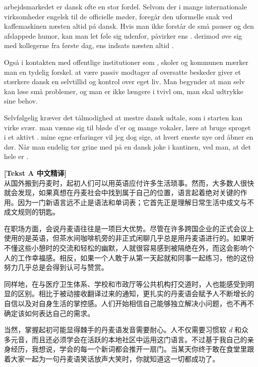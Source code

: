  arbejdsmarkedet er dansk ofte en stor fordel. Selvom der i mange internationale virksomheder  engelsk til de officielle møder, foregår den uformelle snak ved kaffemaskinen næsten altid på dansk. Hvis man ikke forstår de små pauser og den afslappede humor, kan man let føle sig udenfor,  påvirker ens .  derimod øve sig med kollegerne fra første dag,  ens indsats næsten altid .

Også i kontakten med offentlige institutioner som , skoler og kommunen mærker man en tydelig forskel.  at være passiv modtager af oversatte beskeder giver et stærkere dansk en  selvtillid og kontrol over eget liv. Man begynder at  man selv kan løse små problemer, og man er ikke længere i tvivl om,  man skal udtrykke sine behov.

Selvfølgelig kræver det tålmodighed at mestre dansk udtale, som i starten kan virke svær.  man vænne sig til bløde d'er og mange vokaler,  lære at bruge sproget i et aktivt .  mine egne erfaringer vil jeg dog sige, at hvert eneste nye ord åbner en dør. Når man endelig tør grine med på en dansk joke i kantinen, ved man, at det hele er .

\begin{transbox}
\small
\textbf{\color{NCDTeal}[Tekst A 中文精译]}\\
从国外搬到丹麦时，起初人们可以用英语应付许多生活琐事。然而，大多数人很快就会发现，如果真想在丹麦社会中找到属于自己的位置，语言起着绝对关键的作用。因为一门新语言远不止是语法和单词表；它首先正是理解日常生活中成文与不成文规则的钥匙。

在职场方面，会说丹麦语往往是一项巨大优势。尽管在许多跨国企业的正式会议上使用的是英语，但茶水间咖啡机旁的非正式闲聊几乎总是用丹麦语进行的。如果听不懂这些小憩时的交流和轻松的幽默，人就很容易感到被隔绝在外，而这会影响个人的工作幸福感。相反，如果一个人敢于从第一天起就和同事一起练习，他的这份努力几乎总是会得到认可与赞赏。

同样地，在与医疗卫生体系、学校和市政厅等公共机构打交道时，人也能感受到明显的区别。相比于被动接收翻译过来的通知，更扎实的丹麦语会赋予人不断增长的自信以及对自身生活的掌控感。人们开始相信自己能够独立解决小问题，也不再不确定该如何表达自己的需求。

当然，掌握起初可能显得棘手的丹麦语发音需要耐心。人不仅需要习惯软 \textit{d} 和众多元音，而且还必须学会在活跃的本地社区中运用这门语言。不过基于我自己的亲身经历，我想说，学会的每一个新词都会推开一扇门。当某天你终于敢在食堂里跟着大家一起为一句丹麦语笑话放声大笑时，你就知道这一切都成功了。
\end{transbox}

